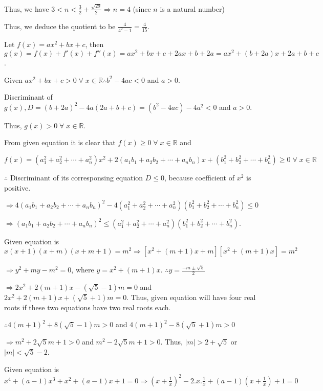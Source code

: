   Thus, we have $3 < n < \frac{3}{2} + \frac{\sqrt{29}}{2}\Rightarrow n = 4$ (since $n$ is a natural number)

  Thus, we deduce the quotient to be $\frac{4}{4^2 - 1} = \frac{4}{15}$.
\item Let $f(x) = ax^2 + bx + c$, then $g(x) = f(x) + f'(x) + f''(x) = ax^2 + bx + c + 2ax + b + 2a = ax^2 +
  (b + 2a)x + 2a + b + c$.

  Given $ax^2 + bx + c > 0\;\forall\;x\in\mathbb{R}\therefore b^2 - 4ac < 0$ and $a > 0$.

  Discriminant of $g(x), D = (b + 2a)^2 - 4a(2a + b + c) = (b^2 - 4ac) - 4a^2 < 0$ and $a > 0$.

  Thus, $g(x) > 0\;\forall\;x\in\mathbb{R}$.
\item From given equation it is clear that $f(x)\geq 0\;\forall\;x\in\mathbb{R}$ and

  $f(x) = (a_1^2 + a_2^2 + \cdots + a_n^2)x^2 + 2(a_1b_1 + a_2b_2 + \cdots + a_nb_n)x + (b_1^2 + b_2^2 +
  \cdots + b_n^2)\geq 0\;\forall\;x\in\mathbb{R}$

  $\therefore$ Discriminant of its corresponsing equation $D \leq 0$, because coefficient of $x^2$ is
  positive.

  $\Rightarrow 4(a_1b_1 + a_2b_2 + \cdots + a_nb_n)^2 - 4(a_1^2 + a_2^2 + \cdots + a_n^2)(b_1^2 + b_2^2 +
  \cdots + b_n^2) \leq 0$

  $\Rightarrow (a_1b_1 + a_2b_2 + \cdots + a_nb_n)^2\leq (a_1^2 + a_2^2 + \cdots + a_n^2)(b_1^2 + b_2^2 +
  \cdots + b_n^2)$.
\item Given equation is $x(x + 1)(x + m)(x + m + 1) = m^2 \Rightarrow [x^2 + (m + 1)x + m][x^2 + (m + 1)x] =
  m^2$

  $\Rightarrow y^2 + my - m^2 = 0$, where $y = x^2 + (m + 1)x$. $\therefore y = \frac{-m\pm\sqrt{5}}{2}$

  $\Rightarrow 2x^2 + 2(m + 1)x - (\sqrt{5} - 1)m = 0$ and $2x^2 + 2(m + 1)x + (\sqrt{5} + 1)m = 0$. Thus,
  given equation will have four real roots if these two equations have two real roots each.

  $\therefore 4(m + 1)^2 + 8(\sqrt{5} - 1)m > 0$ and $4(m + 1)^2 - 8(\sqrt{5} + 1)m > 0$

  $\Rightarrow m^2 + 2\sqrt{5}m + 1 > 0$ and $m^2 - 2\sqrt{5}m + 1 > 0$. Thus, $|m|> 2 + \sqrt{5}$ or $|m| <
  \sqrt{5} - 2$.
\item Given equation is $x^4 + (a - 1)x^3 + x^2 + (a - 1)x + 1 = 0 \Rightarrow \left(x +
  \frac{1}{x}\right)^2 - 2.x.\frac{1}{x} + (a - 1)\left(x + \frac{1}{x}\right) + 1 = 0$

